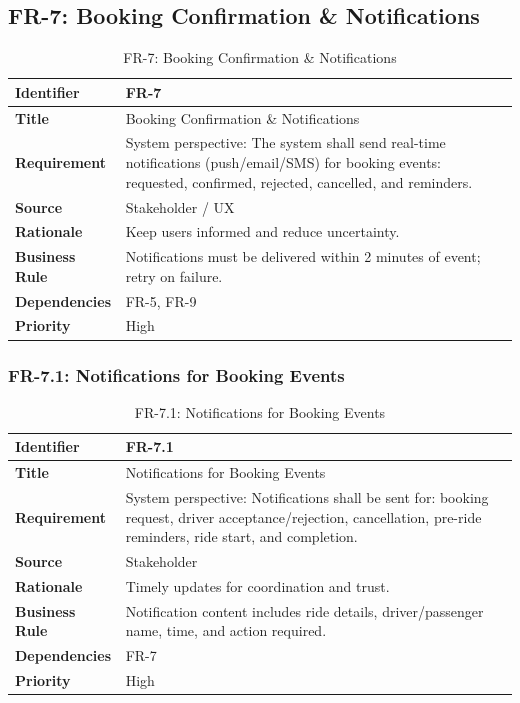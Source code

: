 \subsection{FR-7: Booking Confirmation \& Notifications}

\begin{longtable}{|p{3cm}|p{12cm}|}
\caption{FR-7: Booking Confirmation \& Notifications}
\label{tab:fr-7} \\
\hline
\rowcolor{lightgray!30}
\textbf{Identifier} & FR-7 \\
\hline
\textbf{Title} & Booking Confirmation \& Notifications \\
\hline
\textbf{Requirement} & System perspective: The system shall send real-time notifications (push/email/SMS) for booking events: requested, confirmed, rejected, cancelled, and reminders. \\
\hline
\textbf{Source} & Stakeholder / UX \\
\hline
\textbf{Rationale} & Keep users informed and reduce uncertainty. \\
\hline
\textbf{Business Rule} & Notifications must be delivered within 2 minutes of event; retry on failure. \\
\hline
\textbf{Dependencies} & FR-5, FR-9 \\
\hline
\textbf{Priority} & High \\
\hline
\end{longtable}

\subsubsection{FR-7.1: Notifications for Booking Events}

\begin{longtable}{|p{3cm}|p{12cm}|}
\caption{FR-7.1: Notifications for Booking Events}
\label{tab:fr-7-1} \\
\hline
\rowcolor{lightgray!30}
\textbf{Identifier} & FR-7.1 \\
\hline
\textbf{Title} & Notifications for Booking Events \\
\hline
\textbf{Requirement} & System perspective: Notifications shall be sent for: booking request, driver acceptance/rejection, cancellation, pre-ride reminders, ride start, and completion. \\
\hline
\textbf{Source} & Stakeholder \\
\hline
\textbf{Rationale} & Timely updates for coordination and trust. \\
\hline
\textbf{Business Rule} & Notification content includes ride details, driver/passenger name, time, and action required. \\
\hline
\textbf{Dependencies} & FR-7 \\
\hline
\textbf{Priority} & High \\
\hline
\end{longtable}

